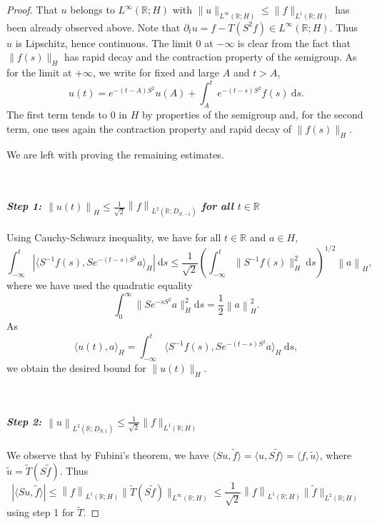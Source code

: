 \documentclass[11pt, letterpaper]{amsart}
\theoremstyle{definition}
\theoremstyle{remark}
\numberwithin{equation}{section}
\begin{document}
\begin{proof} That $u$ belongs to $L^\infty(\mathbb{R};H)$ with $\| u\|_{L^\infty(\mathbb{R};H)} \le \|f\|_{L^1(\mathbb{R};H)}$ has been already observed above. Note that $\partial_t u= f-T(S^2f)\in  L^\infty(\mathbb{R};H)$. Thus $u$ is Lipschitz, hence continuous. The limit 0 at $-\infty$ is clear from the fact that $\|f(s)\|_H$ has rapid decay and the contraction property of the semigroup.  As for the limit at $+\infty$, we write for fixed and large $A$ and $t>A$, 
$$ u(t)= e^{-(t-A)S^2}u(A)+ \int_A^t e^{-(t-s)S^2}f(s) \ \mathrm{d}s. $$
The first term tends to 0 in $H$ by properties of the semigroup and, for the second term, one uses again the contraction property and  rapid decay of $\|f(s)\|_H$. 

We are left with proving the remaining estimates. 

\

\paragraph{\textit{Step 1:  $\left\| u(t)\right\|_H \leq \frac{1}{\sqrt{2}} \left\|f \right\|_{L^2(\mathbb{R}; D_{S,-1})}$ for all $t \in \mathbb{R}$}}
Using Cauchy-Schwarz inequality, we have for all $t \in \mathbb{R}$ and $a \in H$, 
\begin{equation*}
    \int_{-\infty}^{t} | \langle  S^{-1}f(s) ,Se^{-(t-s)S^2} a \rangle_H | \ \mathrm d s \leq \frac{1}{\sqrt{2}}\left ( \int_{-\infty}^{t} \|S^{-1}f(s) \|^2_H \ \mathrm{d}s \right )^{1/2} \left\| a\right\|_H,
\end{equation*}
where we have used the quadratic equality 
\begin{equation*}
    \int_{0}^{\infty} \|Se^{-sS^2}a \|^2_H \mathrm d s =\frac{1}{2}\left\| a\right\|_H^2.
\end{equation*}
As 
\begin{equation*}
    \langle  u(t) , a \rangle_H = \int_{-\infty}^{t} \langle  S^{-1}f(s) , Se^{-(t-s)S^2}a \rangle_H \ \mathrm d s, 
\end{equation*}
we obtain the desired bound for $\|u(t)\|_H$.

\

\paragraph{\textit{Step 2:  $\left\|u \right\|_{L^2(\mathbb{R}; D_{S,1})} \le \frac{1}{\sqrt{2}} \|f\|_{L^1(\mathbb{R};H)}$}}
We observe that by Fubini's theorem, we have $\langle Su, \tilde f\rangle=  \langle u, S\tilde f\rangle=\langle f, \tilde u\rangle$, where $\tilde u=\tilde T(S\tilde f)$. Thus
\begin{equation*}
    |\langle Su, \tilde f\rangle| 
    \le  
    \left \| f  \right \|_{L^1(\mathbb{R};H)}  \| \tilde T(S\tilde f)   \|_{L^\infty(\mathbb{R};H)}
    \le 
    \frac{1}{\sqrt{2}} \left \| f  \right \|_{L^1(\mathbb{R};H)}  \| \tilde f   \|_{L^2(\mathbb{R};H)}
\end{equation*}
using step 1 for $\tilde T$. 


\end{proof}
\end{document}
